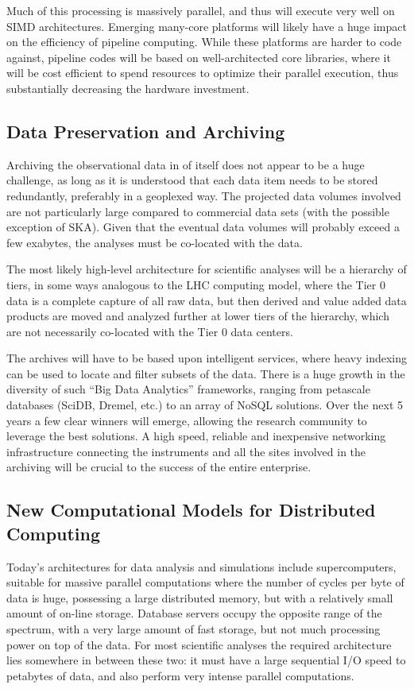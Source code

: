 Much of this processing is massively parallel, and thus will execute
very well on SIMD architectures. Emerging many-core platforms will
likely have a huge impact on the efficiency of pipeline
computing. While these platforms are harder to code against, pipeline
codes will be based on well-architected core libraries, where it will
be cost efficient to spend resources to optimize their parallel
execution, thus substantially decreasing the hardware investment.

\subsection{Data Preservation and Archiving} 

Archiving the observational data in of itself does not appear to be a
huge challenge, as long as it is understood that each data item needs
to be stored redundantly, preferably in a geoplexed way. The projected
data volumes involved are not particularly large compared to
commercial data sets (with the possible exception of SKA). Given that
the eventual data volumes will probably exceed a few exabytes, the
analyses must be co-located with the data.

The most likely high-level architecture for scientific analyses will
be a hierarchy of tiers, in some ways analogous to the LHC computing
model, where the Tier 0 data is a complete capture of all raw data,
but then derived and value added data products are moved and analyzed
further at lower tiers of the hierarchy, which are not necessarily
co-located with the Tier 0 data centers.

The archives will have to be based upon intelligent services, where
heavy indexing can be used to locate and filter subsets of the
data. There is a huge growth in the diversity of such ``Big Data
Analytics'' frameworks, ranging from petascale databases (SciDB,
Dremel, etc.) to an array of NoSQL solutions. Over the next 5 years a
few clear winners will emerge, allowing the research community to
leverage the best solutions. A high speed, reliable and
inexpensive networking infrastructure connecting the instruments and
all the sites involved in the archiving will be crucial to the success
of the entire enterprise.

\subsection{New Computational Models for Distributed Computing}

Today's architectures for data analysis and simulations include
supercomputers, suitable for massive parallel computations where the
number of cycles per byte of data is huge, possessing a large
distributed memory, but with a relatively small amount of on-line
storage. Database servers occupy the opposite range of the spectrum,
with a very large amount of fast storage, but not much processing
power on top of the data. For most scientific analyses the required
architecture lies somewhere in between these two: it must have a large
sequential I/O speed to petabytes of data, and also perform very
intense parallel computations. 

